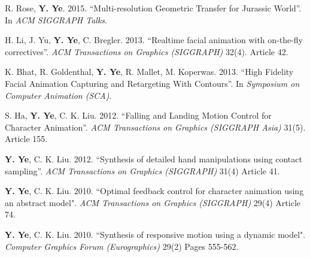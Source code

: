 \documentclass[margin,line]{res}
\begin{document}
\begin{resume}
\vspace*{-.1in}
R. Rose, {\bf Y. Ye}. 2015. ``Multi-resolution Geometric Transfer for Jurassic World''. In {\em ACM SIGGRAPH Talks}.

\vspace*{-.1in}
H. Li, J. Yu, {\bf Y. Ye}, C. Bregler. 2013. ``Realtime facial animation with on-the-fly correctives''. {\em ACM Transactions on Graphics (SIGGRAPH)} 32(4). Article 42. %

\vspace*{-.1in}
K. Bhat, R. Goldenthal, {\bf Y. Ye}, R. Mallet, M. Koperwas. 2013. ``High Fidelity Facial Animation Capturing and Retargeting With Contours''. In {\em Symposium on Computer Animation (SCA)}. 

\vspace*{-.1in}
S. Ha, {\bf Y. Ye}, C. K. Liu. 2012. ``Falling and Landing Motion Control for Character Animation''. {\em ACM Transactions on Graphics  (SIGGRAPH Asia)} 31(5). Article 155. %

\vspace*{-.1in}
{\bf Y. Ye}, C. K. Liu. 2012. ``Synthesis of detailed hand manipulations using contact sampling''. {\em ACM Transactions on Graphics (SIGGRAPH)} 31(4) Article 41. %

\vspace*{-.1in}
{\bf Y. Ye}, C. K. Liu. 2010. ``Optimal feedback control for character animation using an abstract model". {\em ACM Transactions on Graphics (SIGGRAPH)} 29(4) Article 74. %

\vspace*{-.1in}
{\bf Y. Ye}, C. K. Liu. 2010. ``Synthesis of responsive motion using a dynamic model". {\em Computer Graphics Forum (Eurographics)} 29(2) Pages 555-562. %


\end{resume}
\end{document}
